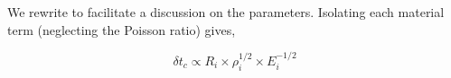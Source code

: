 We rewrite  to facilitate a discussion on the parameters. Isolating each material term (neglecting the Poisson ratio) gives, 

\begin{equation}
	\delta t_c \propto R_i \times \rho_i^{1/2} \times E_i^{-1/2}
\end{equation}








